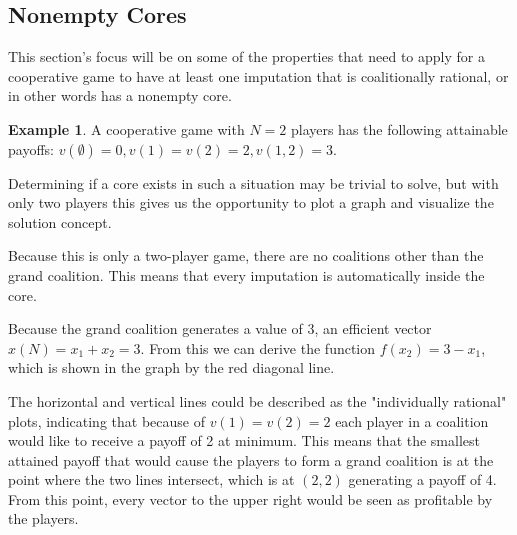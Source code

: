 \documentclass[10pt,a4paper,titlepage]{article}
\theoremstyle{plain}
\theoremstyle{definition}
\newtheorem{example}[thm]{Example} %
\begin{document}
\subsection{Nonempty Cores}
This section's focus will be on some of the properties that need to apply for a cooperative game to have at least one imputation that is coalitionally rational, or in other words has a nonempty core.

\begin{example}
    A cooperative game with $N = 2$ players has the following attainable payoffs: $v(\emptyset) = 0, v(1) = v(2) = 2, v(1, 2) = 3$.

    Determining if a core exists in such a situation may be trivial to solve, but with only two players this gives us the opportunity to plot a graph and visualize the solution concept.
    
    Because this is only a two-player game, there are no coalitions other than the grand coalition. This means that every imputation is automatically inside the core.
    
\end{example}

Because the grand coalition generates a value of 3, an efficient vector $x(N) = x_1 + x_2 = 3$. From this we can derive the function $f(x_2) = 3 - x_1$, which is shown in the graph by the red diagonal line.

The horizontal and vertical lines could be described as the "individually rational" plots, indicating that because of $v(1) = v(2) = 2$ each player in a coalition would like to receive a payoff of 2 at minimum. This means that the smallest attained payoff that would cause the players to form a grand coalition is at the point where the two lines intersect, which is at $(2, 2)$ generating a payoff of 4. From this point, every vector to the upper right would be seen as profitable by the players.
\end{document}
